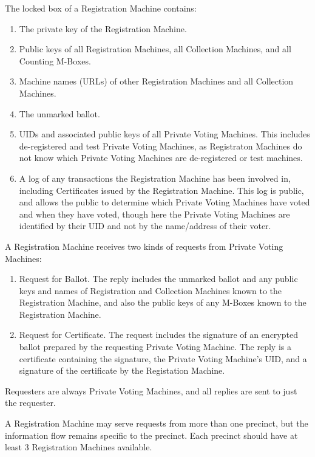 \documentclass[12pt]{article}
\begin{document}
The locked box of a Registration Machine contains:
\begin{enumerate}
\item The private key of the Registration Machine.
\item Public keys of all Registration Machines, all Collection
Machines, and all Counting M-Boxes.
\item Machine names (URLs) of other Registration Machines and all Collection
Machines.
\item The unmarked ballot.
\item UIDs and associated public keys of all Private Voting
Machines.  This includes de-registered and test Private Voting
Machines, as Registraton Machines do not know which Private Voting
Machines are de-registered or test machines.
\item A log of any transactions the Registration Machine has
been involved in, including  Certificates issued by the Registration Machine.
This log is public, and allows the public to determine which Private
Voting Machines have voted and when they have voted, though here the
Private Voting Machines are identified by their UID and not by the
name/address of their voter.
\end{enumerate}

A Registration Machine receives two kinds of requests from
Private Voting Machines:
\begin{enumerate}

\item
Request for Ballot.  The reply includes the unmarked ballot
and any public keys and names of Registration and
Collection Machines known to the Registration Machine,
and also the public keys of any M-Boxes known to the Registration
Machine.

\item
Request for Certificate.  The request includes the signature
of an encrypted ballot prepared by the requesting Private
Voting Machine.  The reply is a certificate containing
the signature, the Private Voting Machine's UID,
and a signature of the certificate by the Registation Machine.

\end{enumerate}

Requesters are always Private Voting Machines, and all replies
are sent to just the requester.

A Registration Machine may serve requests from more than
one precinct, but the information flow remains specific
to the precinct.  Each precinct should have at least 3
Registration Machines available.
\end{document}
